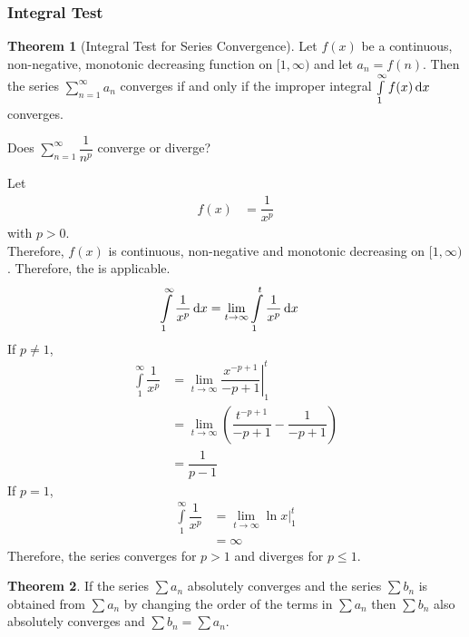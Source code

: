 \documentclass[fleqn, a4paper, 12pt, twoside]{article}
\theoremstyle{definition}
\theoremstyle{theorem}
\newtheorem{theorem}{Theorem}
\begin{document}
{\subsubsection{Integral Test}

\begin{theorem}[Integral Test for Series Convergence]
	Let $f(x)$ be a continuous, non-negative, monotonic decreasing function on $[1,\infty)$ and let $a_n = f(n)$.
	Then the series $\sum\limits_{n = 1}^{\infty} a_n$ converges if and only if the improper integral $\int\limits_{1}^{\infty} f(x) \dif x$ converges.
	\label{Integral Test for Series Convergence}
\end{theorem}

\begin{question}
	Does $\sum\limits_{n = 1}^{\infty} \dfrac{1}{n^p}$ converge or diverge?
\end{question}

\begin{solution}
	Let
	\begin{align*}
		f(x) &= \dfrac{1}{x^p}
	\end{align*}
	with $p > 0$.\\
	Therefore, $f(x)$ is continuous, non-negative and monotonic decreasing on $[1,\infty)$.
	Therefore, the  is applicable.
	\begin{align*}
		\int\limits_{1}^{\infty} \dfrac{1}{x^p} \dif x &= \lim\limits_{t \to \infty} \int\limits_{1}^{t} \dfrac{1}{x^p} \dif x
	\end{align*}
	If $p \neq 1$,
	\begin{align*}
		\int\limits_{1}^{\infty} \dfrac{1}{x^p} &= \lim\limits_{t \to \infty} \left. \dfrac{x^{-p + 1}}{-p + 1} \right|_{1}^{t}\\
		&= \lim\limits_{t \to \infty} \left( \dfrac{t^{-p + 1}}{-p + 1} - \dfrac{1}{-p + 1} \right)\\
		&= \dfrac{1}{p - 1}
	\end{align*}
	If $p = 1$,
	\begin{align*}
		\int\limits_{1}^{\infty} \dfrac{1}{x^p} &= \lim\limits_{t \to \infty} \left. \ln x \right|_{1}^{t}\\
		&= \infty
	\end{align*}
	Therefore, the series converges for $p > 1$ and diverges for $p \le 1$.
\end{solution}

\begin{theorem}
	If the series $\sum a_n$ absolutely converges and the series $\sum b_n$ is obtained from $\sum a_n$ by changing the order of the terms in $\sum a_n$ then $\sum b_n$ also absolutely converges and $\sum b_n = \sum a_n$.
\end{theorem}

}
\end{document}
